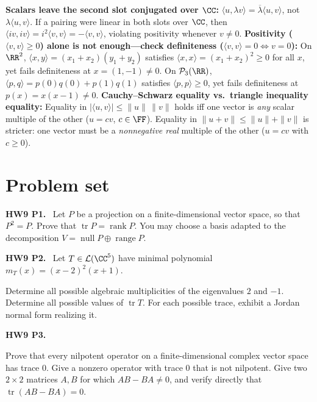 \documentclass[10pt]{scrartcl}
\newcommand{\ip}[2]{\langle #1,#2\rangle}
\DeclareMathOperator{\tr}{tr}\DeclareMathOperator{\nul}{null}\DeclareMathOperator{\range}{range}\DeclareMathOperator{\spn}{span}
\newcommand{\LL}{\mathcal L}\newcommand{\PP}{\mathcal P}\newcommand{\MM}{\mathcal M}
\begin{document}
\begin{trapbox}
  \ii \textbf{Scalars leave the second slot conjugated over $\CC$:} $\ip u{\lambda v}=\overline{\lambda}\ip uv$, not $\lambda\ip uv$. If a pairing were linear in both slots over $\CC$, then $\ip{iv}{iv}=i^2\ip vv=-\ip vv$, violating positivity whenever $v\ne 0$.
  \ii \textbf{Positivity ($\ip vv\ge 0$) alone is not enough---check definiteness ($\ip vv=0\iff v=0$):} On $\RR^2$, $\ip xy=(x_1+x_2)(y_1+y_2)$ satisfies $\ip xx=(x_1+x_2)^2\ge 0$ for all $x$, yet fails definiteness at $x=(1,-1)\ne 0$. On $\PP_3(\RR)$, $\ip pq=p(0)q(0)+p(1)q(1)$ satisfies $\ip pp\ge 0$, yet fails definiteness at $p(x)=x(x-1)\ne 0$.
  \ii \textbf{Cauchy--Schwarz equality vs.\ triangle inequality equality:} Equality in $|\ip uv|\le\|u\|\,\|v\|$ holds iff one vector is \emph{any} scalar multiple of the other ($u=cv$, $c\in\FF$). Equality in $\|u+v\|\le\|u\|+\|v\|$ is stricter: one vector must be a \emph{nonnegative real} multiple of the other ($u=cv$ with $c\ge 0$).
\end{trapbox}

\section{Problem set}

\begin{prob}
\textbf{HW9 P1. }\ Let $P$ be a projection on a finite-dimensional vector space, so that $P^2=P$. Prove that $\tr P=\operatorname{rank}P$. You may choose a basis adapted to the decomposition $V=\nul P\oplus\range P$.
\end{prob}

\begin{prob}
\textbf{HW9 P2. }\ Let $T\in\LL(\CC^5)$ have minimal polynomial $m_T(x)=(x-2)^2(x+1)$.
\begin{enumerate}[(a)]
  \ii Determine all possible algebraic multiplicities of the eigenvalues $2$ and $-1$.
  \ii Determine all possible values of $\tr T$.
  \ii For each possible trace, exhibit a Jordan normal form realizing it.
\end{enumerate}
\end{prob}

\begin{prob}
\textbf{HW9 P3. }\ 
\begin{enumerate}[(a)]
  \ii Prove that every nilpotent operator on a finite-dimensional complex vector space has trace $0$.
  \ii Give a nonzero operator with trace $0$ that is not nilpotent.
  \ii Give two $2\times2$ matrices $A,B$ for which $AB-BA\ne0$, and verify directly that $\tr(AB-BA)=0$.
\end{enumerate}
\end{prob}
\end{document}
